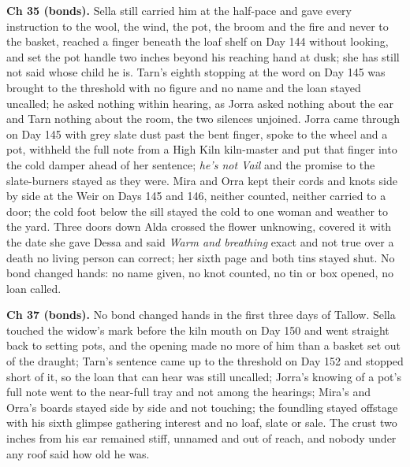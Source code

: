 \documentclass{design/chronicle}
\begin{document}
{\textbf{Ch 35 (bonds).} Sella still carried him at the half-pace and gave every instruction to the wool, the wind, the pot, the broom and the fire and never to the basket, reached a finger beneath the loaf shelf on Day 144 without looking, and set the pot handle two inches beyond his reaching hand at dusk; she has still not said whose child he is. Tarn’s eighth stopping at the word on Day 145 was brought to the threshold with no figure and no name and the loan stayed uncalled; he asked nothing within hearing, as Jorra asked nothing about the ear and Tarn nothing about the room, the two silences unjoined. Jorra came through on Day 145 with grey slate dust past the bent finger, spoke to the wheel and a pot, withheld the full note from a High Kiln kiln-master and put that finger into the cold damper ahead of her sentence; \emph{he’s not Vail} and the promise to the slate-burners stayed as they were. Mira and Orra kept their cords and knots side by side at the Weir on Days 145 and 146, neither counted, neither carried to a door; the cold foot below the sill stayed the cold to one woman and weather to the yard. Three doors down Alda crossed the flower unknowing, covered it with the date she gave Dessa and said \emph{Warm and breathing} exact and not true over a death no living person can correct; her sixth page and both tins stayed shut. No bond changed hands: no name given, no knot counted, no tin or box opened, no loan called.

\textbf{Ch 37 (bonds).} No bond changed hands in the first three days of Tallow. Sella touched the widow’s mark before the kiln mouth on Day 150 and went straight back to setting pots, and the opening made no more of him than a basket set out of the draught; Tarn’s sentence came up to the threshold on Day 152 and stopped short of it, so the loan that can hear was still uncalled; Jorra’s knowing of a pot’s full note went to the near-full tray and not among the hearings; Mira’s and Orra’s boards stayed side by side and not touching; the foundling stayed offstage with his sixth glimpse gathering interest and no loaf, slate or sale. The crust two inches from his ear remained stiff, unnamed and out of reach, and nobody under any roof said how old he was.

}
\end{document}

